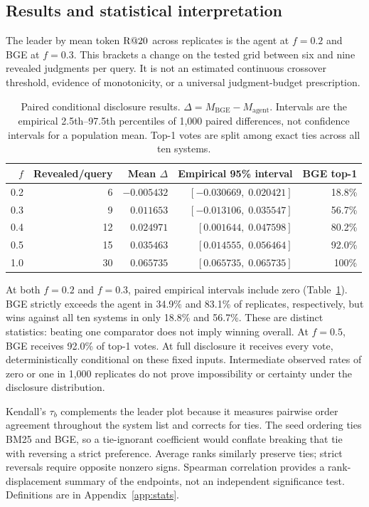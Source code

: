 \subsection{Results and statistical interpretation}
The leader by mean token $\mathrm{R}@20$ across replicates is the agent at $f=0.2$ and BGE at $f=0.3$. This brackets a change on the tested grid between six and nine revealed judgments per query. It is not an estimated continuous crossover threshold, evidence of monotonicity, or a universal judgment-budget prescription.

\begin{table}[t]
\centering
\caption{Paired conditional disclosure results. $\Delta=M_{\mathrm{BGE}}-M_{\mathrm{agent}}$. Intervals are the empirical 2.5th--97.5th percentiles of 1,000 paired differences, not confidence intervals for a population mean. Top-1 votes are split among exact ties across all ten systems.}
\label{tab:disclosure}
\begin{tabular}{@{}rrrrr@{}}
\toprule
$f$ & Revealed/query & Mean $\Delta$ & Empirical 95\% interval & BGE top-1 \\
\midrule
0.2 & 6 & $-0.005432$ & $[-0.030669,\;0.020421]$ & 18.8\% \\
0.3 & 9 & $0.011653$ & $[-0.013106,\;0.035547]$ & 56.7\% \\
0.4 & 12 & $0.024971$ & $[0.001644,\;0.047598]$ & 80.2\% \\
0.5 & 15 & $0.035463$ & $[0.014555,\;0.056464]$ & 92.0\% \\
1.0 & 30 & $0.065735$ & $[0.065735,\;0.065735]$ & 100\% \\
\bottomrule
\end{tabular}
\end{table}

At both $f=0.2$ and $f=0.3$, paired empirical intervals include zero (Table~\ref{tab:disclosure}). BGE strictly exceeds the agent in 34.9\% and 83.1\% of replicates, respectively, but wins against all ten systems in only 18.8\% and 56.7\%. These are distinct statistics: beating one comparator does not imply winning overall. At $f=0.5$, BGE receives 92.0\% of top-1 votes. At full disclosure it receives every vote, deterministically conditional on these fixed inputs. Intermediate observed rates of zero or one in 1,000 replicates do not prove impossibility or certainty under the disclosure distribution.

Kendall's $\tau_b$ complements the leader plot because it measures pairwise order agreement throughout the system list and corrects for ties. The seed ordering ties BM25 and BGE, so a tie-ignorant coefficient would conflate breaking that tie with reversing a strict preference. Average ranks similarly preserve ties; strict reversals require opposite nonzero signs. Spearman correlation provides a rank-displacement summary of the endpoints, not an independent significance test. Definitions are in Appendix~\ref{app:stats}.

